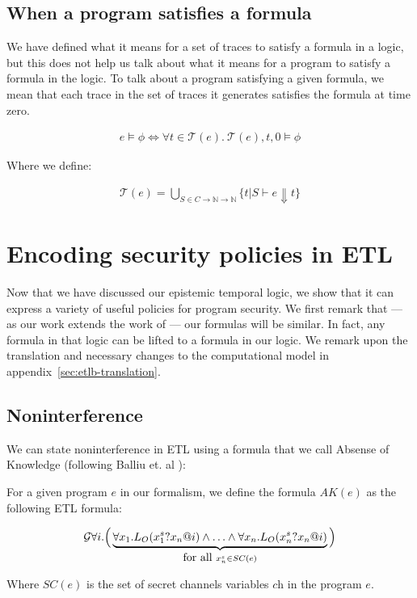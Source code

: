 \documentclass[conference]{IEEEtran}
\theoremstyle{definition}
\newcommand{\sch}{\textit{ch}}
\newcommand{\traces}[1]{\mathcal{T}(#1)}
\newcommand{\tr}{t\xspace}
\newcommand{\talways}{\mathcal{G}}
\begin{document}
\subsection{When a  program satisfies a formula}

We have defined what it means for a set of traces to satisfy a formula
in a logic, but this does not help us talk about what it means for a
program to satisfy a formula in the logic.  To talk about a program
satisfying a given formula, we mean that each trace in the set of
traces it generates satisfies the formula at time zero.

\begin{displaymath}
  \begin{array}{c}
    e \models \phi \iff
    \forall \tr \in \traces{e}.~ \traces{e},\tr,0 \models \phi
  \end{array}
\end{displaymath}

Where we define:

\begin{displaymath}
  \begin{array}{c}
    \traces{e} = \bigcup\limits_{S \in C \to \mathbb{N} \to \mathbb{N}} \{ \tr
    | S \vdash e \Downarrow \tr \}
  \end{array}
\end{displaymath}


\section{Encoding security policies in ETL}
\label{sec:encodings}

Now that we have discussed our epistemic temporal logic, we show that
it can express a variety of useful policies for program security.  We
first remark that --- as our work extends the work of
\cite{Balliua:11} --- our formulas will be similar.  In fact, any
formula in that logic can be lifted to a formula in our logic.  We
remark upon the translation and necessary changes to the computational
model in appendix~\ref{sec:etlb-translation}.

\subsection{Noninterference}

We can state noninterference in ETL using a formula that we call
Absense of Knowledge (following Balliu et. al \cite{Balliu:11}):

\begin{Definition}
  For a given program $e$ in our formalism, we define the formula
  $AK(e)$ as the following ETL formula:

  \begin{displaymath}
  \talways \forall i. \Big( \underbrace{
     \forall x_1. L_O(x_1^s ? x_n @ i) \wedge \ldots \wedge
    \forall x_n. L_O(x_n^s ? x_n @ i) }_{\hbox{for all } x_n^s \in SC(e)} \Big )
  \end{displaymath}
  
  Where $SC(e)$ is the set of secret channels variables $\sch$ in the
  program $e$.
\end{Definition}
\end{document}
